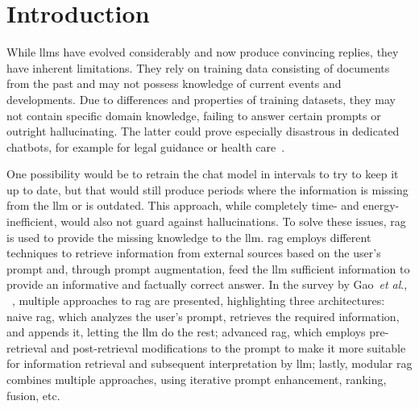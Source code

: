 \documentclass[fleqn,moreauthors,10pt]{ds_report}
\affiliation{\textit{Advisors: Aleš Žagar}}
\newcommand{\etal}{\textit{et al}., }
\begin{document}
\flushbottom 

\maketitle 

\thispagestyle{empty} 


\section*{Introduction}
    
While \acp{llm} have evolved considerably and now produce convincing replies, they have inherent limitations. They rely on training data consisting of documents from the past and may not possess knowledge of current events and developments. Due to differences and properties of training datasets, they may not contain specific domain knowledge, failing to answer certain prompts or outright hallucinating. The latter could prove especially disastrous in dedicated chatbots, for example for legal guidance or health care~\cite{thirunavukarasu2023large}.

One possibility would be to retrain the chat model in intervals to try to keep it up to date, but that would still produce periods where the information is missing from the \ac{llm} or is outdated. This approach, while completely time- and energy-inefficient, would also not guard against hallucinations. To solve these issues, \ac{rag} is used to provide the missing knowledge to the \ac{llm}. \ac{rag} employs different techniques to retrieve information from external sources based on the user’s prompt and, through prompt augmentation, feed the \ac{llm} sufficient information to provide an informative and factually correct answer. In the survey by Gao~\etal~\cite{survey}, multiple approaches to \ac{rag} are presented, highlighting three architectures: naive \ac{rag}, which analyzes the user’s prompt, retrieves the required information, and appends it, letting the \ac{llm} do the rest; advanced \ac{rag}, which employs pre-retrieval and post-retrieval modifications to the prompt to make it more suitable for information retrieval and subsequent interpretation by \ac{llm}; lastly, modular \ac{rag} combines multiple approaches, using iterative prompt enhancement, ranking, fusion, etc.
\end{document}
